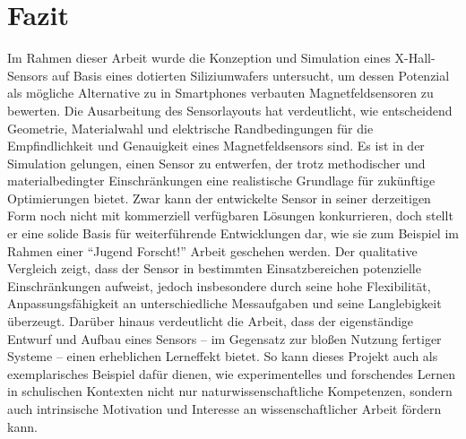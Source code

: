 \documentclass[12pt, a4paper]{article}
\begin{document}
\section{Fazit}
Im Rahmen dieser Arbeit wurde die Konzeption und Simulation eines X-Hall-Sensors auf Basis eines dotierten Siliziumwafers untersucht, um dessen Potenzial als mögliche Alternative zu in Smartphones verbauten Magnetfeldsensoren zu bewerten. Die Ausarbeitung des Sensorlayouts hat verdeutlicht, wie entscheidend Geometrie, Materialwahl und elektrische Randbedingungen für die Empfindlichkeit und Genauigkeit eines Magnetfeldsensors sind.\newline
Es ist in der Simulation gelungen, einen Sensor zu entwerfen, der trotz methodischer und materialbedingter Einschränkungen eine realistische Grundlage für zukünftige Optimierungen bietet. Zwar kann der entwickelte Sensor in seiner derzeitigen Form noch nicht mit kommerziell verfügbaren Lösungen konkurrieren, doch stellt er eine solide Basis für weiterführende Entwicklungen dar, wie sie zum Beispiel im Rahmen einer ``Jugend Forscht!'' Arbeit geschehen werden.\newline
Der qualitative Vergleich zeigt, dass der Sensor in bestimmten Einsatzbereichen potenzielle Einschränkungen aufweist, jedoch insbesondere durch seine hohe Flexibilität, Anpassungsfähigkeit an unterschiedliche Messaufgaben und seine Langlebigkeit überzeugt.\newline
Darüber hinaus verdeutlicht die Arbeit, dass der eigenständige Entwurf und Aufbau eines Sensors – im Gegensatz zur bloßen Nutzung fertiger Systeme – einen erheblichen Lerneffekt bietet. So kann dieses Projekt auch als exemplarisches Beispiel dafür dienen, wie experimentelles und forschendes Lernen in schulischen Kontexten nicht nur naturwissenschaftliche Kompetenzen, sondern auch intrinsische Motivation und Interesse an wissenschaftlicher Arbeit fördern kann.
\end{document}
